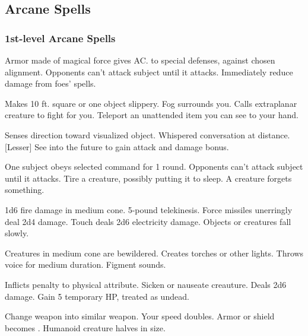 \subsection{Arcane Spells}\label{Arcane Spells}
\subsubsection{1st-level Arcane Spells}
\begin{swspelllist}
     Armor made of magical force gives  AC.
      to special defenses,  against chosen alignment.
     Opponents can't attack subject until it attacks.
     Immediately reduce damage from foes' spells.

     Makes 10 ft. square or one object slippery.
     Fog surrounds you.
     Calls extraplanar creature to fight for you.
     Teleport an unattended item you can see to your hand.

    \spellhead[Div]{}
     Senses direction toward visualized object.
     Whispered conversation at distance.
    [Lesser] See into the future to gain attack and damage bonus.

     One subject obeys selected command for 1 round.
     Opponents can't attack subject until it attacks.
     Tire a creature, possibly putting it to sleep.
     A creature forgets something.

     1d6 fire damage in medium cone.
     5-pound telekinesis.
     Force missiles unerringly deal 2d4 damage.
     Touch deals 2d6 electricity damage.
     Objects or creatures fall slowly.

     Creatures in medium cone are bewildered.
     Creates torches or other lights.
     Throws voice for medium duration.
     Figment sounds.

     Inflicts  penalty to physical attribute.
     Sicken or nauseate creauture.
     Deals 2d6 damage.
     Gain 5 temporary HP, treated as undead.

     Change weapon into similar weapon.
     Your speed doubles.
     Armor or shield becomes .
     Humanoid creature halves in size.
\end{swspelllist}

